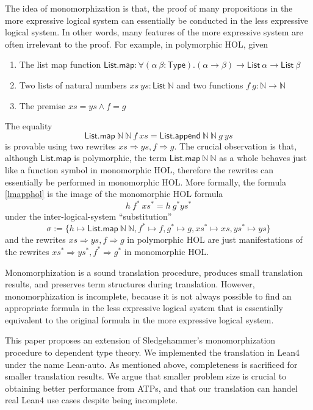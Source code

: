  The idea of monomorphization is that, the proof of many propositions in the more expressive logical
  system can essentially be conducted in the less expressive logical system. In other words,
  many features of the more expressive system are often irrelevant to the proof. For example,
  in polymorphic HOL, given
  \begin{enumerate}
    \item The list map function $\mathsf{List.map} : \forall (\alpha \ \beta : \mathsf{Type}). (\alpha \to \beta) \to \mathsf{List} \ \alpha \to \mathsf{List} \ \beta$
    \item Two lists of natural numbers $xs \ ys : \mathsf{List} \ \mathbb{N}$ and two functions $f \ g : \mathbb{N} \to \mathbb{N}$
    \item The premise $xs = ys \land f = g$
  \end{enumerate}
  The equality
  \begin{equation}\label{lmapphol}
    \mathsf{List.map} \ \mathbb{N} \ \mathbb{N} \ f \ xs = \mathsf{List.append} \ \mathbb{N} \ \mathbb{N} \ g \ ys
  \end{equation}
  is provable using two rewrites $xs \Rightarrow ys, f \Rightarrow g$. The crucial observation is that, although $\textsf{List.map}$ is polymorphic, the term
  $\mathsf{List.map} \ \mathbb{N} \ \mathbb{N}$ as a whole behaves just like a function symbol in monomorphic HOL,
  therefore the rewrites can essentially be performed in monomorphic HOL. More formally,
  the formula \eqref{lmapphol} is the image of the monomorphic HOL formula
  $$h \ f^* \ xs^* = h \ g^* ys^*$$
  under the inter-logical-system ``substitution''
  $$\sigma := \{h \mapsto \mathsf{List.map} \ \mathbb{N} \ \mathbb{N},
    f^* \mapsto f, g^* \mapsto g, xs^* \mapsto xs, ys^* \mapsto ys\}$$
  and the rewrites $xs \Rightarrow ys, f \Rightarrow g$ in polymorphic HOL are just manifestations of the
  rewrites $xs^* \Rightarrow ys^*, f^* \Rightarrow g^*$ in monomorphic HOL.
  
  Monomorphization is a sound translation procedure, produces small translation results, and preserves
  term structures during translation. However, monomorphization is incomplete,
  because it is not always possible to find an appropriate formula in the less
  expressive logical system that is essentially equivalent to the original formula
  in the more expressive logical system.

  This paper proposes an extension of Sledgehammer's monomorphization procedure
  to dependent type theory. We implemented the translation in Lean4 under the name Lean-auto.
  As mentioned above, completeness is sacrificed for smaller translation
  results. We argue that smaller problem size is crucial to obtaining better performance
  from ATPs, and that our translation can handel real Lean4 use cases despite being incomplete.